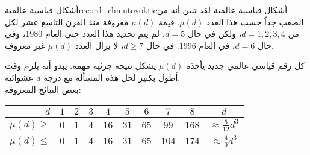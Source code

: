 \begin{surferIntroPage}{أشكال قياسية عالمية}{record_chmutovoktic}{أشكال قياسية عالمية}
لقد تبين أنه من الصعب جداً حسب هذا العدد $\mu(d)$.
قيمة $\mu(d)$ معروفة منذ القرن التاسع عشر لكل من $d=1,2,3,4$، ولكن في حال $d=5$، لم يتم تحديد هذا العدد حتى العام 1980، وفي حال $d=6$، في العام 1996.
   في حال $d\ge 7$، لا يزال العدد $\mu(d)$ غير معروف.


    كل رقم قياسي عالمي جديد يأخذه $\mu(d)$  يشكل نتيجة جزئية مهمة. يبدو أنه يلزم وقت أطول بكثير لحل هذه المسألة مع درجة $d$ عشوائية.\\ بعض النتائج المعروفة:

   \begin{center}
      \begin{tabular}{r|cccccccc|c}
        $d$ & $1$ & $2$ & $3$ & $4$ & $5$ & $6$ & $7$ & $8$ & $d$\\
        \hline
        \hline
        \rule{0pt}{1.2em}$\mu(d)\ge$ & $0$ & $1$ & $4$ & $16$ & $31$ & $65$ &
        $99$ & $168$ &
        $\approx \frac{5}{12}d^3$\\[0.3em]
        \hline
        \rule{0pt}{1.2em}$\mu(d)\le$ & $0$ & $1$ & $4$ & $16$ & $31$ & $65$ &
        $104$ & $174$ & $\approx \frac{4}{9}d^3$
      \end{tabular}
    \end{center}
\end{surferIntroPage}
